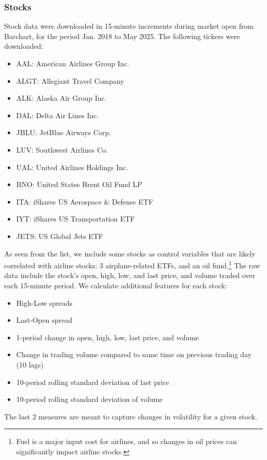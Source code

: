 \documentclass[12pt]{article}
\begin{document}
\subsubsection{Stocks}
Stock data were downloaded in 15-minute increments during market open from Barchart, for the period Jan. 2018 to May 2025. The following tickers were downloaded:
\begin{itemize}
\singlespacing
    \item AAL: American Airlines Group Inc.
    \item ALGT: Allegiant Travel Company
    \item ALK: Alaska Air Group Inc.
    \item DAL: Delta Air Lines Inc.
    \item JBLU: JetBlue Airways Corp.
    \item LUV: Southwest Airlines Co.
    \item UAL: United Airlines Holdings Inc.
    \item BNO: United States Brent Oil Fund LP
    \item ITA: iShares US Aerospace \& Defense ETF
    \item IYT: iShares US Transportation ETF
    \item JETS: US Global Jets ETF
\end{itemize}
As seen from the list, we include some stocks as control variables that are likely correlated with airline stocks: 3 airplane-related ETFs, and an oil fund.\footnote{Fuel is a major input cost for airlines, and so changes in oil prices can significantly impact airline stocks.} The raw data include the stock's open, high, low, and last price, and volume traded over each 15-minute period. We calculate additional features for each stock:
\begin{itemize}
\singlespacing
    \item High-Low spreads
    \item Last-Open spread
    \item 1-period change in open, high, low, last price, and volume
    \item Change in trading volume compared to same time on previous trading day (10 lags)
    \item 10-period rolling standard deviation of last price
    \item 10-period rolling standard deviation of volume
\end{itemize}
The last 2 measures are meant to capture changes in volatility for a given stock.
\end{document}
